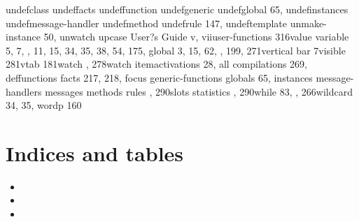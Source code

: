 \documentclass[letterpaper,10pt,english]{sphinxmanual}
\begin{document}
undefclass undeffacts undeffunction
undefgeneric undefglobal 65, undefinstances
undefmessage-handler undefmethod undefrule
147, undeftemplate unmake-instance 50,
unwatch upcase User?s Guide v,
viiuser-functions 316value variable 5, 7, , 11, 15, 34, 35,
38, 54, 175, global 3, 15, 62, , 199, 271vertical bar
7visible 281vtab 181watch , 278watch itemactivations 28,
all compilations 269, deffunctions
facts 217, 218, focus generic-functions
globals 65, instances message-handlers
messages methods rules , 290slots
statistics , 290while 83, , 266wildcard 34, 35,
wordp 160


\chapter{Indices and tables}
\label{\detokenize{index:indices-and-tables}}\begin{itemize}
\item {} 

\item {} 

\item {} 

\end{itemize}



\renewcommand{\indexname}{Index}
\printindex
\end{document}

